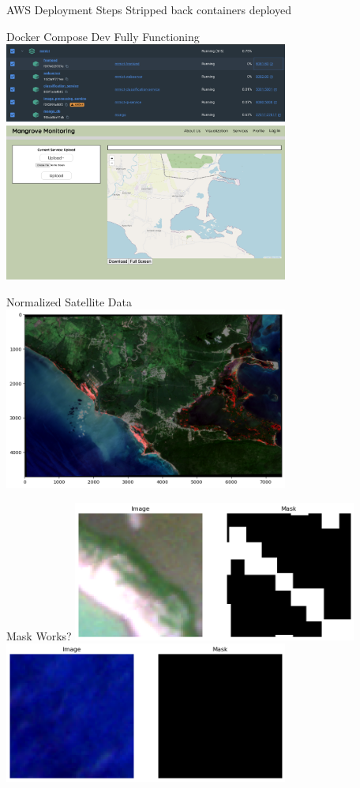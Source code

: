 \begin{frame}{AWS Deployment Steps}
    Stripped back containers deployed
\end{frame}

\begin{frame}{Docker Compose Dev Fully Functioning}
     \centering
     \includegraphics[height=0.7\textheight,width=0.7\textwidth,keepaspectratio]{images/MM4.png}
     \includegraphics[height=0.7\textheight,width=0.7\textwidth,keepaspectratio]{images/MM5.png}
\end{frame}

\begin{frame}{Normalized Satellite Data}
     \centering
     \includegraphics[height=0.7\textheight,width=0.7\textwidth,keepaspectratio]{images/MM3.png}
\end{frame}

\begin{frame}{Mask Works?}
     \centering
     \includegraphics[height=0.7\textheight,width=0.7\textwidth,keepaspectratio]{images/MM1.png}
     \includegraphics[height=0.7\textheight,width=0.7\textwidth,keepaspectratio]{images/MM2.png}
\end{frame}
